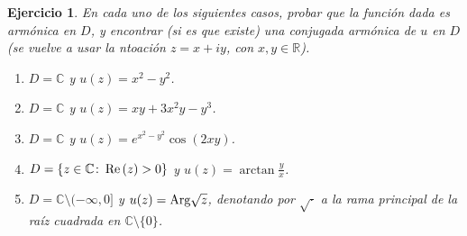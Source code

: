 \documentclass[11pt]{report}
\newcommand{\R}{\mathbb R}
\newcommand{\C}{\mathbb C}
\newcommand{\pars}[1]{\left( #1 \right)} %
\renewcommand{\Re}[1]{\,\textup{Re}\pars{#1}}
\newtheorem{exercise}{Ejercicio}
\theoremstyle{remark}
\begin{document}
\begin{exercise}
    En cada uno de los siguientes casos, probar que la función dada es armónica en $D$, y encontrar (si es que existe) una conjugada armónica de $u$ en $D$ (se vuelve a usar la ntoación $z = x+iy$, con $x,y\in\R$).
    \begin{enumerate}
        \item $D = \C$ y $u(z) = x^2-y^2$.
        \item $D = \C$ y $u(z) = xy+3x^2y-y^3$.
        \item $D = \C$ y $u(z) = e^{x^2-y^2}\cos(2xy)$.
        \item $D = \{z \in \C \colon \Re{z} > 0\}$ y $u(z) = \arctan\frac{y}{x}$.
        \item $D = \C\setminus (-\infty,0]$ y $u(z) = \textup{Arg}\sqrt{z}$, denotando por $\sqrt{\cdot}$ a la rama principal de la raíz cuadrada en $\C \setminus \{0\}$.
    \end{enumerate}
\end{exercise}
\end{document}
